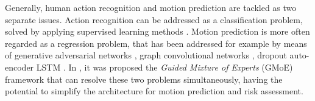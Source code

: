Generally, human action recognition and motion prediction are tackled as two separate issues.
Action recognition can be addressed as a classification problem, solved by applying supervised learning methods \cite{Zhao2019, Ji2012}. Motion prediction is more often regarded as a regression problem, that has been addressed for example by means of generative adversarial networks \cite{Hernandez2019}, graph convolutional networks \cite{Mao2019}, dropout auto-encoder LSTM \cite{Ghosh2017}. 
In \cite{Kourosh2022}, it was proposed the \emph{Guided Mixture of Experts} (GMoE) framework that can resolve these two problems simultaneously, having the potential to simplify the architecture for motion prediction and risk assessment.

